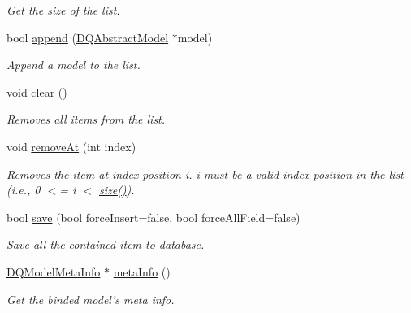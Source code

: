 \begin{DoxyCompactItemize}
\begin{DoxyCompactList}\small\item\em Get the size of the list. \item\end{DoxyCompactList}\item 
bool \hyperlink{classDQSharedList_adf41e7baf9d654822ac241d7b8d8e404}{append} (\hyperlink{classDQAbstractModel}{DQAbstractModel} $\ast$model)
\begin{DoxyCompactList}\small\item\em Append a model to the list. \item\end{DoxyCompactList}\item 
\hypertarget{classDQSharedList_a80ee6896432a12ec96d069be5c9dfdbc}{
void \hyperlink{classDQSharedList_a80ee6896432a12ec96d069be5c9dfdbc}{clear} ()}
\label{classDQSharedList_a80ee6896432a12ec96d069be5c9dfdbc}

\begin{DoxyCompactList}\small\item\em Removes all items from the list. \item\end{DoxyCompactList}\item 
\hypertarget{classDQSharedList_af2dc317705579a1f7bd965f71cf32ee2}{
void \hyperlink{classDQSharedList_af2dc317705579a1f7bd965f71cf32ee2}{removeAt} (int index)}
\label{classDQSharedList_af2dc317705579a1f7bd965f71cf32ee2}

\begin{DoxyCompactList}\small\item\em Removes the item at index position i. i must be a valid index position in the list (i.e., 0 $<$= i $<$ \hyperlink{classDQSharedList_a7686c471ce10b212b120ac2676d466e8}{size()}). \item\end{DoxyCompactList}\item 
bool \hyperlink{classDQSharedList_ab64026c377a6bd43663a39f684c2eff6}{save} (bool forceInsert=false, bool forceAllField=false)
\begin{DoxyCompactList}\small\item\em Save all the contained item to database. \item\end{DoxyCompactList}\item 
\hyperlink{classDQModelMetaInfo}{DQModelMetaInfo} $\ast$ \hyperlink{classDQSharedList_aa7d6dd862ef0d3753784e3bdf35ddea3}{metaInfo} ()
\begin{DoxyCompactList}\small\item\em Get the binded model's meta info. \item\end{DoxyCompactList}\end{DoxyCompactItemize}
